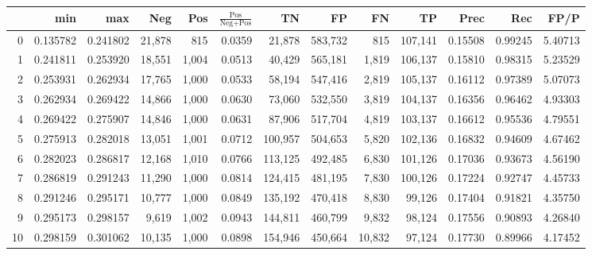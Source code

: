 \begin{tabular}{rrrrrrrrrrrrr}
\toprule
{} &       min &       max &     Neg &    Pos & $\frac{\text{Pos}}{\text{Neg}+\text{Pos}}$ &       TN &       FP &       FN &       TP &     Prec &      Rec &     FP/P \\
\midrule
0   &  0.135782 &  0.241802 &  21,878 &    815 &                                     0.0359 &   21,878 &  583,732 &      815 &  107,141 &  0.15508 &  0.99245 &  5.40713 \\
1   &  0.241811 &  0.253920 &  18,551 &  1,004 &                                     0.0513 &   40,429 &  565,181 &    1,819 &  106,137 &  0.15810 &  0.98315 &  5.23529 \\
2   &  0.253931 &  0.262934 &  17,765 &  1,000 &                                     0.0533 &   58,194 &  547,416 &    2,819 &  105,137 &  0.16112 &  0.97389 &  5.07073 \\
3   &  0.262934 &  0.269422 &  14,866 &  1,000 &                                     0.0630 &   73,060 &  532,550 &    3,819 &  104,137 &  0.16356 &  0.96462 &  4.93303 \\
4   &  0.269422 &  0.275907 &  14,846 &  1,000 &                                     0.0631 &   87,906 &  517,704 &    4,819 &  103,137 &  0.16612 &  0.95536 &  4.79551 \\
5   &  0.275913 &  0.282018 &  13,051 &  1,001 &                                     0.0712 &  100,957 &  504,653 &    5,820 &  102,136 &  0.16832 &  0.94609 &  4.67462 \\
6   &  0.282023 &  0.286817 &  12,168 &  1,010 &                                     0.0766 &  113,125 &  492,485 &    6,830 &  101,126 &  0.17036 &  0.93673 &  4.56190 \\
7   &  0.286819 &  0.291243 &  11,290 &  1,000 &                                     0.0814 &  124,415 &  481,195 &    7,830 &  100,126 &  0.17224 &  0.92747 &  4.45733 \\
8   &  0.291246 &  0.295171 &  10,777 &  1,000 &                                     0.0849 &  135,192 &  470,418 &    8,830 &   99,126 &  0.17404 &  0.91821 &  4.35750 \\
9   &  0.295173 &  0.298157 &   9,619 &  1,002 &                                     0.0943 &  144,811 &  460,799 &    9,832 &   98,124 &  0.17556 &  0.90893 &  4.26840 \\
10  &  0.298159 &  0.301062 &  10,135 &  1,000 &                                     0.0898 &  154,946 &  450,664 &   10,832 &   97,124 &  0.17730 &  0.89966 &  4.17452 \\

\end{tabular}
